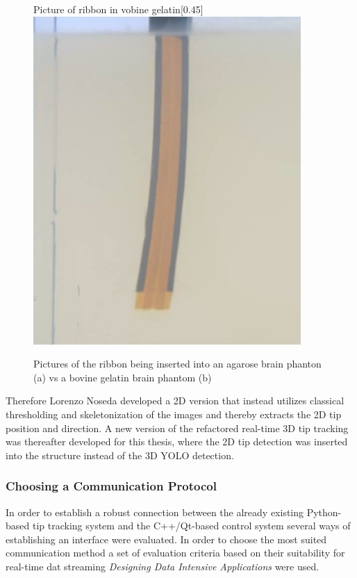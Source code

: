 \begin{figure}[htbp]
\begin{subcaptionbox}{Picture of ribbon in vobine gelatin\label{fig:right}}[0.45\linewidth]
        {\includegraphics[width=\linewidth]{images/RibbonPicture/gelatin2.PNG}}
    \end{subcaptionbox}
    \caption{Pictures of the ribbon being inserted into an agarose brain phanton (a) vs a bovine gelatin brain phantom (b)}
    \label{fig:side_by_side}
\end{figure}
Therefore Lorenzo Noseda developed a 2D version that instead utilizes classical thresholding and skeletonization of the images and thereby extracts the 2D tip position and direction. A new version of the refactored real-time 3D tip tracking was thereafter developed for this thesis, where the 2D tip detection was inserted into the structure instead of the 3D YOLO detection.

\subsubsection{Choosing a Communication Protocol}
In order to establish a robust connection between the already existing Python-based tip tracking system and the C++/Qt-based control system several ways of establishing an interface were evaluated. In order to choose the most suited communication method a set of evaluation criteria based on their suitability for real-time dat streaming \textit{Designing Data Intensive Applications} \cite{kleppmann_designing_2017} were used.

